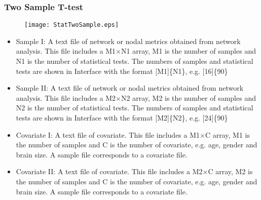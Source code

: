 \documentclass[11pt]{article}
\begin{document}
            \subsubsection{Two Sample T-test}
				\begin{figure}
					\begin{center}
						\texttt{[image: StatTwoSample.eps]}
					\end{center}
				\end{figure}
                \begin{itemize}
                    \item Sample I: A text file of network or nodal
                        metrics obtained from network analysis. This file
                        includes a M1$\times$N1 array, M1 is the number of
                        samples and N1 is the number of statistical tests.
                        The numbers of samples and statistical tests are
                        shown in Interface with the format [M1]\{N1\}, 
                        e.g. [16]\{90\}
                    \item Sample II: A text file of network or nodal
                        metrics obtained from network analysis. This file
                        includes a M2$\times$N2 array, M2 is the number of
                        samples and N2 is the number of statistical tests.
                        The numbers of samples and statistical tests are
                        shown in Interface with the format [M2]\{N2\}, 
                        e.g. [24]\{90\}
                    \item Covariate I: A text file of covariate. This file
                        includes a M1$\times$C array, M1 is the number of 
                        samples and C is the number of covariate, e.g. 
                        age, gender and brain size. A sample file 
                        corresponds to a covariate file.
                    \item Covariate II: A text file of covariate. This file
                        includes a M2$\times$C array, M2 is the number of 
                        samples and C is the number of covariate, e.g. 
                        age, gender and brain size. A sample file 
                        corresponds to a covariate file.
                \end{itemize}
\end{document}
